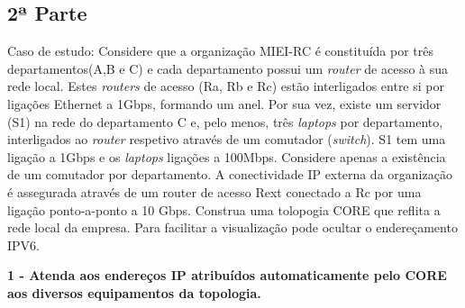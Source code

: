 \documentclass[a4paper]{article}
\begin{document}
\newpage

\subsection{2ª Parte}
Caso de estudo: Considere que a organização MIEI-RC é constituída por três departamentos(A,B e C) e cada
departamento possui um \textit{router} de acesso à sua rede local. Estes \textit{routers} de acesso (Ra, Rb e Rc) estão
interligados entre si por ligações Ethernet a 1Gbps, formando um anel. Por sua vez, existe um servidor (S1) na rede do departamento C e, pelo menos, três \textit{laptops} por departamento, interligados ao \textit{router} respetivo através de um comutador (\textit{switch}). S1 tem uma ligação a 1Gbps e os \textit{laptops} ligações a 100Mbps. Considere apenas a existência de um comutador por departamento.\newline
A conectividade IP externa da organização é assegurada através de um router de acesso Rext conectado a Rc por uma ligação ponto-a-ponto a 10 Gbps.\newline
Construa uma tolopogia CORE que reflita a rede local da empresa. Para facilitar a visualização pode ocultar o endereçamento IPV6.\newline

\textbf{1 - Atenda aos endereços IP atribuídos automaticamente pelo CORE aos diversos equipamentos da topologia.}\newline
\vspace{1cm}
\end{document}
